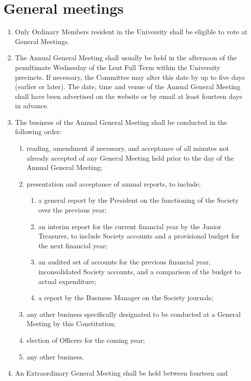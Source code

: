 \documentclass{article}
\begin{document}
\section{General meetings}

\begin{enumerate}
\item Only Ordinary Members resident in the University shall be eligible to vote
at General Meetings.
\item The Annual General Meeting shall usually be held in the afternoon of
the penultimate Wednesday of the Lent Full Term within the University
precincts. If necessary, the Committee may alter this date by up to five
days (earlier or later). The date, time and venue of the Annual General
Meeting shall have been advertised on the website or by email at least
fourteen days in advance.
\item The business of the Annual General Meeting shall be conducted in the
following order:
  \begin{enumerate}
  \item reading, amendment if necessary, and acceptance of all minutes not
  already accepted of any General Meeting held prior to the day of the
  Annual General Meeting;
  \item presentation and acceptance of annual reports, to include:
    \begin{enumerate}
    \item a general report by the President on the functioning of the Society over the previous year;
    \item an interim report for the current financial year by the Junior
    Treasurer, to include Society accounts and a provisional budget for the next
    financial year;
    \item an audited set of accounts for the previous financial year, inconsolidated Society accounts, and a comparison of the
    budget to actual expenditure;
    \item a report by the Business Manager on the Society journals;
    \end{enumerate}
  \item any other business specifically designated to be conducted at a General Meeting by this Constitution;
  \item election of Officers for the coming year;
  \item any other business.
  \end{enumerate}
\item An Extraordinary General Meeting shall be held between fourteen and

\end{enumerate}
\end{document}
